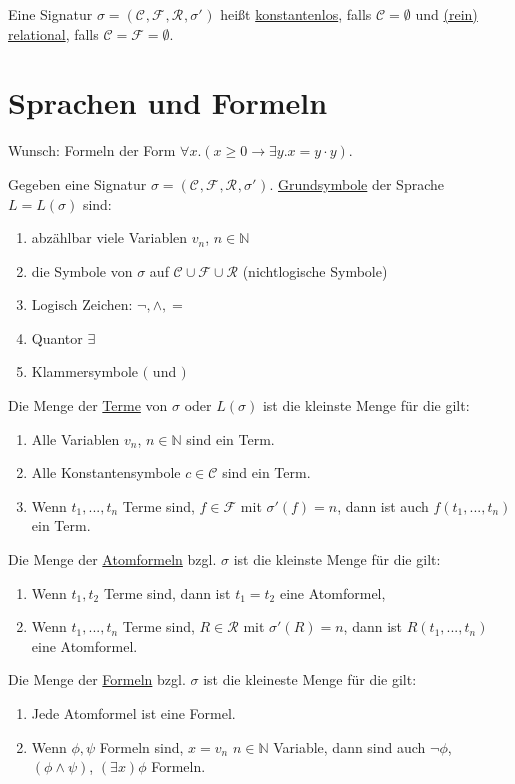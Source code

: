\documentclass{article}
\theoremstyle{definition}
\newcommand{\calC}{\mathcal{C}}
\newcommand{\calF}{\mathcal{F}}
\newcommand{\calR}{\mathcal{R}}
\newcommand{\sign}[1]{(\calC_{#1}, \calF_{#1}, \calR_{#1}, \sigma'_{#1})}
\begin{document}
    Eine Signatur $ \sigma = \sign{} $ heißt \underline{konstantenlos}, falls $ \calC = \emptyset $ und \underline{(rein) relational}, falls $ \calC = \calF = \emptyset $.

    \section{Sprachen und Formeln}

    Wunsch: Formeln der Form $ \forall x. (x \geq 0 \rightarrow \exists y. x = y \cdot y) $.

    Gegeben eine Signatur $ \sigma = \sign{} $.
    \underline{Grundsymbole} der Sprache $ L = L(\sigma) $ sind:
    \begin{enumerate}
        \item abzählbar viele Variablen $ v_n $, $ n \in \mathbb{N} $
        \item die Symbole von $ \sigma $ auf $ \calC \cup \calF \cup \calR $ (nichtlogische Symbole)
        \item Logisch Zeichen: $ \neg, \land, = $
        \item Quantor $ \exists $
        \item Klammersymbole $ ( $ und $ ) $
    \end{enumerate}

    Die Menge der \underline{Terme} von $ \sigma $ oder $ L(\sigma) $ ist die kleinste Menge für die gilt:
    \begin{enumerate}
        \item Alle Variablen $ v_n $, $ n \in \mathbb{N} $ sind ein Term.
        \item Alle Konstantensymbole $ c \in \calC $ sind ein Term.
        \item Wenn $ t_1, ..., t_n $ Terme sind, $ f \in \calF $ mit $ \sigma'(f) = n $, dann ist auch $ f(t_1, ..., t_n) $ ein Term.
    \end{enumerate}

    Die Menge der \underline{Atomformeln} bzgl. $ \sigma $ ist die kleinste Menge für die gilt:
    \begin{enumerate}
        \item Wenn $ t_1, t_2 $ Terme sind, dann ist $ t_1 = t_2 $ eine Atomformel,
        \item Wenn $ t_1, ..., t_n $ Terme sind, $ R \in \calR $ mit $ \sigma'(R) = n $, dann ist $ R(t_1, ..., t_n) $ eine Atomformel.
    \end{enumerate}

    Die Menge der \underline{Formeln} bzgl. $\sigma $ ist die kleineste Menge für die gilt:
    \begin{enumerate}
        \item Jede Atomformel ist eine Formel.
        \item Wenn $ \phi, \psi $ Formeln sind, $ x = v_n $ $ n \in \mathbb{N} $ Variable, dann sind auch $ \neg \phi$, $ (\phi \land \psi) $, $ (\exists x) \phi $ Formeln.
    \end{enumerate}
\end{document}
